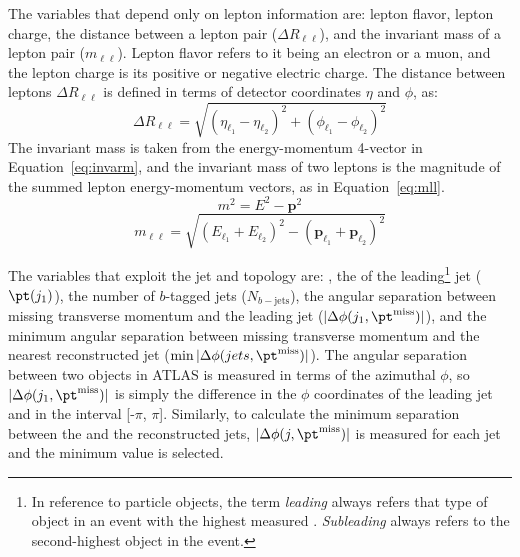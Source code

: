 The variables that depend only on lepton information are: lepton flavor, lepton charge, the distance between a lepton pair ($\Delta R_{\ell\ell}$), and the invariant mass of a lepton pair ($m_{\ell\ell}$).  Lepton flavor refers to it being an electron or a muon, and the lepton charge is its positive or negative electric charge.  The distance between leptons $\Delta R_{\ell\ell}$ is defined in terms of detector coordinates $\eta$ and $\phi$, as:
\begin{equation}
\Delta R_{\ell\ell} = \sqrt{(\eta_{\ell_1}-\eta_{\ell_2})^2+(\phi_{\ell_1}-\phi_{\ell_2})^2}
\end{equation} 
The invariant mass is taken from the energy-momentum 4-vector in Equation~\ref{eq:invarm}, and the invariant mass of two leptons is the magnitude of the summed lepton energy-momentum vectors, as in Equation~\ref{eq:mll}.
 \begin{equation}
m^2 = E^2-\mathbf{p}^2
\label{eq:invarm}
\end{equation} 
 \begin{equation}
m_{\ell\ell} = \sqrt{(E_{\ell_1}+E_{\ell_2})^2 - (\mathbf{p}_{\ell_1}+\mathbf{p}_{\ell_2})^2}
\label{eq:mll}
\end{equation} 

The variables that exploit the jet and \met topology are: \met{}, the \pt of the leading\footnote{In reference to particle objects, the term \textit{leading} always refers that type of object in an event with the highest measured \pt{}.  \textit{Subleading} always refers to the second-highest \pt{} object in the event.} jet ($\pt(j_1)$), the number of $b$-tagged jets ($N_{b-\mathrm{jets}}$), the angular separation between missing transverse momentum and the leading jet ($|\Delta\phi(j_1, \pt^{\mathrm{miss}})|$), and the minimum angular separation between missing transverse momentum and the nearest reconstructed jet ($\min|\Delta\phi(jets, \pt^{\mathrm{miss}})|$).  The angular separation between two objects in ATLAS is measured in terms of the azimuthal $\phi$, so $|\Delta\phi(j_1, \pt^{\mathrm{miss}})|$ is simply the difference in the $\phi$ coordinates of the leading jet and \met{} in the interval [-$\pi$, $\pi$].  Similarly, to calculate the minimum separation between the \met and the reconstructed jets, $|\Delta\phi(j, \pt^{\mathrm{miss}})|$ is measured for each jet and the minimum value is selected.

